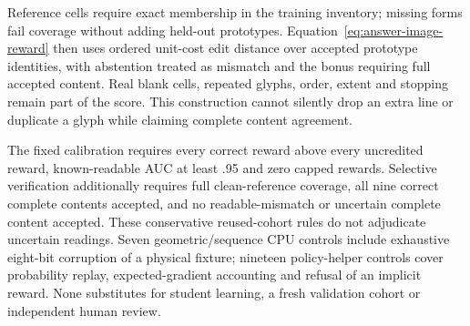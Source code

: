 Reference cells require exact membership in the training inventory; missing
forms fail coverage without adding held-out prototypes. Equation~\ref{eq:answer-image-reward}
then uses ordered unit-cost edit distance over accepted prototype identities,
with abstention treated as mismatch and the bonus requiring full accepted
content. Real blank cells, repeated glyphs, order, extent and stopping remain
part of the score. This construction cannot silently drop an extra line or
duplicate a glyph while claiming complete content agreement.

The fixed calibration requires every correct reward above every uncredited
reward, known-readable AUC at least .95 and zero capped rewards. Selective
verification additionally requires full clean-reference coverage, all nine
correct complete contents accepted, and no readable-mismatch or uncertain
complete content accepted. These conservative reused-cohort rules do not
adjudicate uncertain readings. Seven geometric/sequence CPU controls include
exhaustive eight-bit corruption of a physical fixture; nineteen policy-helper
controls cover probability replay, expected-gradient accounting and refusal of
an implicit reward. None substitutes for student learning, a fresh validation
cohort or independent human review.
